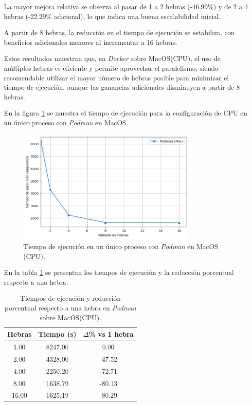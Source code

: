 La mayor mejora relativa se observa al pasar de 1 a 2 hebras (-46.99\%) y de 2 a 4 hebras (-22.29\% adicional), lo que indica una buena escalabilidad inicial.

A partir de 8 hebras, la reducción en el tiempo de ejecución se estabiliza, con beneficios adicionales menores al incrementar a 16 hebras.

Estos resultados muestran que, en \textit{Docker} sobre MacOS(CPU), el uso de múltiples hebras es eficiente y permite aprovechar el paralelismo, siendo recomendable utilizar el mayor número de hebras posible para minimizar el tiempo de ejecución, aunque las ganancias adicionales disminuyen a partir de 8 hebras.

En la figura \ref{fig:single-node_mac_podman_time} se muestra el tiempo de ejecución para la configuración de CPU en un único proceso con \textit{Podman} en MacOS.

\begin{figure}[ht]
    \centering
    \includegraphics[width=0.8\textwidth]{imagenes/cap5/single-node_mac_podman_time.png}
    \caption{Tiempo de ejecución en un único proceso con \textit{Podman} en MacOS (CPU).}
    \label{fig:single-node_mac_podman_time}
\end{figure}

En la tabla \ref{tab:single-node_mac_podman_time} se presentan los tiempos de ejecución y la reducción porcentual respecto a una hebra.

\begin{table}[ht]
    \centering
    \begin{tabular}{|c|c|c|}
        \hline
        \textbf{Hebras} & \textbf{Tiempo (s)} & \textbf{$\Delta$\% vs 1 hebra} \\
        \hline
        1.00            & 8247.00             & 0.00                           \\
        2.00            & 4328.00             & -47.52                         \\
        4.00            & 2250.20             & -72.71                         \\
        8.00            & 1638.79             & -80.13                         \\
        16.00           & 1625.19             & -80.29                         \\
        \hline
    \end{tabular}
    \caption{Tiempos de ejecución y reducción porcentual respecto a una hebra en \textit{Podman} sobre MacOS(CPU).}
    \label{tab:single-node_mac_podman_time}
\end{table}

